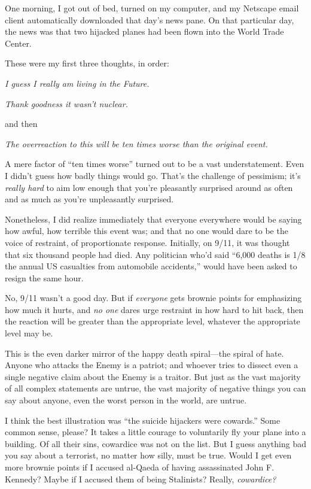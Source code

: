 \myendsectiontext


\bigskip


{
 One morning, I got out of bed, turned on my computer, and my
Netscape email client automatically downloaded that
day's news pane. On that particular day, the news was
that two hijacked planes had been flown into the World Trade Center. }

{
 These were my first three thoughts, in order:}

{
 \textit{I guess I really am living in the Future.}}

{
 \textit{Thank goodness it wasn't nuclear.}}

{
 and then}

{
 \textit{The overreaction to this will be ten times worse than the
original event.}}

{
 A mere factor of ``ten times
worse'' turned out to be a vast understatement. Even
I didn't guess how badly things would go.
That's the challenge of pessimism; it's
\textit{really hard} to aim low enough that you're
pleasantly surprised around as often and as much as
you're unpleasantly surprised.}

{
 Nonetheless, I did realize immediately that everyone everywhere
would be saying how awful, how terrible this event was; and that no one
would dare to be the voice of restraint, of proportionate response.
Initially, on 9/11, it was thought that six thousand people had died.
Any politician who'd said ``6,000
deaths is 1/8 the annual US casualties from automobile
accidents,'' would have been asked to resign the same
hour.}

{
 No, 9/11 wasn't a good day. But if
\textit{everyone} gets brownie points for emphasizing how much it
hurts, and \textit{no one} dares urge restraint in how hard to hit
back, then the reaction will be greater than the appropriate level,
whatever the appropriate level may be.}

{
 This is the even darker mirror of the happy death spiral---the
spiral of hate. Anyone who attacks the Enemy is a patriot; and whoever
tries to dissect even a single negative claim about the Enemy is a
traitor. But just as the vast majority of all complex statements are
untrue, the vast majority of negative things you can say about anyone,
even the worst person in the world, are untrue.}

{
 I think the best illustration was ``the suicide
hijackers were cowards.'' Some common sense, please?
It takes a little courage to voluntarily fly your plane into a
building. Of all their sins, cowardice was not on the list. But I guess
anything bad you say about a terrorist, no matter how silly, must be
true. Would I get even more brownie points if I accused al-Qaeda of
having assassinated John F. Kennedy? Maybe if I accused them of being
Stalinists? Really, \textit{cowardice?}}

